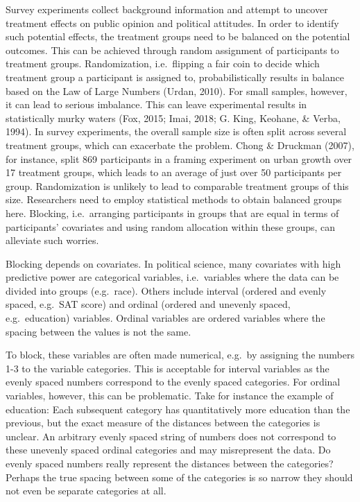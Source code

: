 \documentclass[12pt,econ]{sources/authesis}
\begin{document}
Survey experiments collect background information and attempt to uncover treatment effects on public opinion and political attitudes. In order to identify such potential effects, the treatment groups need to be balanced on the potential outcomes. This can be achieved through random assignment of participants to treatment groups. Randomization, i.e.~flipping a fair coin to decide which treatment group a participant is assigned to, probabilistically results in balance based on the Law of Large Numbers (Urdan, 2010). For small samples, however, it can lead to serious imbalance. This can leave experimental results in statistically murky waters (Fox, 2015; Imai, 2018; G. King, Keohane, \& Verba, 1994). In survey experiments, the overall sample size is often split across several treatment groups, which can exacerbate the problem. Chong \& Druckman (2007), for instance, split 869 participants in a framing experiment on urban growth over 17 treatment groups, which leads to an average of just over 50 participants per group. Randomization is unlikely to lead to comparable treatment groups of this size. Researchers need to employ statistical methods to obtain balanced groups here. Blocking, i.e.~arranging participants in groups that are equal in terms of participants' covariates and using random allocation within these groups, can alleviate such worries.

Blocking depends on covariates. In political science, many covariates with high predictive power are categorical variables, i.e.~variables where the data can be divided into groups (e.g.~race). Others include interval (ordered and evenly spaced, e.g.~SAT score) and ordinal (ordered and unevenly spaced, e.g.~education) variables. Ordinal variables are ordered variables where the spacing between the values is not the same.

To block, these variables are often made numerical, e.g.~by assigning the numbers 1-3 to the variable categories. This is acceptable for interval variables as the evenly spaced numbers correspond to the evenly spaced categories. For ordinal variables, however, this can be problematic. Take for instance the example of education: Each subsequent category has quantitatively more education than the previous, but the exact measure of the distances between the categories is unclear. An arbitrary evenly spaced string of numbers does not correspond to these unevenly spaced ordinal categories and may misrepresent the data. Do evenly spaced numbers really represent the distances between the categories? Perhaps the true spacing between some of the categories is so narrow they should not even be separate categories at all.
\end{document}
